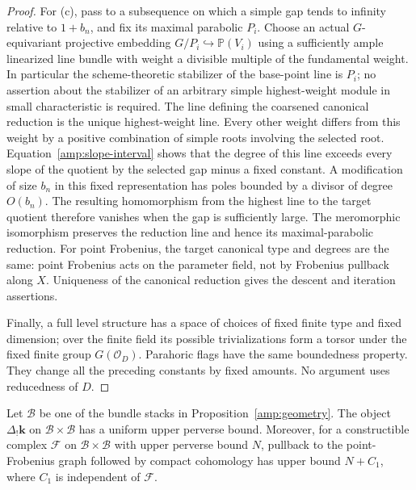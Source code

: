 \begin{proof}
For (c), pass to a subsequence on which a simple gap tends to infinity
relative to $1+b_n$, and fix its maximal parabolic $P_i$.
Choose an actual $G$-equivariant projective embedding
$G/P_i\hookrightarrow\mathbb P(V_i)$ using a sufficiently ample
linearized line bundle with weight a divisible multiple of the
fundamental weight.  In particular the scheme-theoretic stabilizer
of the base-point line is $P_i$; no assertion about the stabilizer
of an arbitrary simple highest-weight module in small characteristic
is required.
The line defining the coarsened canonical reduction is the unique
highest-weight line.  Every other weight differs from this weight
by a positive combination of simple roots involving the selected
root.  Equation~\eqref{amp:slope-interval} shows that the degree of this
line exceeds every slope of the quotient by the selected gap minus
a fixed constant.  A modification of size $b_n$ in this fixed
representation has poles bounded by a divisor of degree $O(b_n)$.
The resulting homomorphism from the highest line to the target
quotient therefore vanishes when the gap is sufficiently large.
The meromorphic isomorphism preserves the reduction line and hence
its maximal-parabolic reduction.  For point Frobenius, the target
canonical type and degrees are the same: point Frobenius acts on
the parameter field, not by Frobenius pullback along $X$.
Uniqueness of the canonical reduction gives the descent and
iteration assertions.

Finally, a full level structure has a space of choices of fixed
finite type and fixed dimension; over the finite field its possible
trivializations form a torsor under the fixed finite group
$G(\mathcal O_D)$.  Parahoric flags have the same boundedness
property.  They change all the preceding constants by fixed amounts.
No argument uses reducedness of $D$.
\end{proof}

\begin{lemma}
\label{amp:trace-bound}
Let $\mathcal B$ be one of the bundle stacks in
Proposition~\ref{amp:geometry}.  The object
$\Delta_!\mathbf k$ on $\mathcal B\times\mathcal B$ has a uniform
upper perverse bound.  Moreover, for a constructible complex
$\mathcal F$ on $\mathcal B\times\mathcal B$ with upper perverse bound
$N$, pullback to the point-Frobenius graph followed by compact
cohomology has upper bound $N+C_1$, where $C_1$ is independent of
$\mathcal F$.
\end{lemma}

